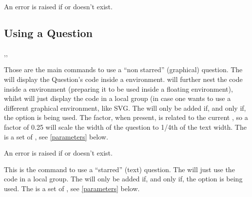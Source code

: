 \documentclass[10pt]{article}
\begin{document}
\begin{tsremark}
An error is raised if  or  doesn't exist.
\end{tsremark}


\subsection{Using a Question}\label{question use}
\begin{codedescribe}{\ftikzQuestion,\tikzQuestion,\rawtikzQuestion}
\begin{codesyntax}%
\tsobj{\ftikzQuestion}
\tsobj{\tikzQuestion}
\tsobj{\rawtikzQuestion}
\end{codesyntax}
Those are the main commands to use a ``non starred'' (graphical) question.
The \tsobj{\tikzQuestion} will display the Question's code inside a  environment. \tsobj{\ftikzQuestion} will further nest the code inside a  environment (preparing it to be used inside a floating environment), whilst \tsobj{\rawtikzQuestion} will just display the code in a local group (in case one wants to use a different graphical environment, like SVG. The  will only be added if, and only if, the  option is being used. The  factor, when present, is related to the current \tsobj{\textwidth}, so a factor of 0.25 will scale the width of the question to 1/4th of the text width. The  is a set of , see \ref{parameters} below.
\end{codedescribe}

\begin{tsremark}
An error is raised if  or  doesn't exist.
\end{tsremark}

\begin{codedescribe}{\textQuestion}
\begin{codesyntax}%
\tsobj{\textQuestion}
\end{codesyntax}
This is the command to use a ``starred'' (text) question.
The \tsobj{\textQuestion} will just use the code in a local group. The  will only be added if, and only if, the  option is being used. The  is a set of , see \ref{parameters} below.
\end{codedescribe}
\end{document}
